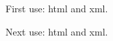 \documentclass[12pt]{article}
\begin{document}
First use: \gls{html} and \gls{xml}. 

Next use: \gls{html} and \gls{xml}. 
\end{document}
